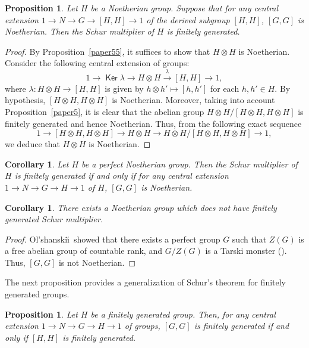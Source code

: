 \documentclass[12pt,reqno]{amsart}
\newtheorem{proposition}[subsection]{Proposition}
\newtheorem{corollary}[subsection]{Corollary}
\theoremstyle{definition}
\numberwithin{equation}{section}
\theoremstyle{definition}
\def\lam{\lambda}
\DeclareMathOperator{\Ker}{\mathsf {Ker}}
\begin{document}
\begin{proposition}
Let $H$ be a Noetherian group. Suppose that for any central extension $1\to N \to G \to [H, H] \to 1$ of the derived subgroup $[H, H]$, $[G, G]$ is Noetherian.
Then the Schur multiplier of $H$ is finitely generated.
\end{proposition}
\begin{proof}
By Proposition~\ref{paper55}, it suffices to show that $H\otimes H$ is Noetherian. Consider the following central extension of groups:
\[
1\to \Ker \lam \to H\otimes H \overset{\lam }{\longrightarrow} [H, H]\to 1 ,
\]
where $\lam \colon H\otimes H \to [H, H]$ is given by $h\otimes h'\mapsto [h, h']$ for each $h, h'\in H$. By hypothesis, $[H\otimes H, H\otimes H]$ is Noetherian. Moreover,
taking into account Proposition~\ref{paper5}, it is clear that the abelian group $H\otimes H / [H\otimes H, H\otimes H]$ is finitely generated and hence Noetherian. Thus, from the following exact sequence
\[
1\to  [H\otimes H, H\otimes H] \to H\otimes H \to H\otimes H / [H\otimes H, H\otimes H]\to 1 ,
\]
we deduce that $H\otimes H$ is Noetherian.
\end{proof}

\begin{corollary}
Let $H$ be a perfect Noetherian group. Then the Schur multiplier of $H$ is finitely generated if and only if for any central extension $1\to N \to G \to H \to 1$ of $H$, $[G, G]$ is Noetherian.
\end{corollary}

\begin{corollary}
There exists a Noetherian group which does not have finitely generated Schur multiplier.
\end{corollary}
\begin{proof}
Ol'shanski\u\i \ showed that there exists a perfect group $G$ such that $Z(G)$ is a free abelian group of countable
rank, and $G/Z(G)$ is a Tarski monster (\!\cite{Olsh}). Thus, $[G, G]$ is not Noetherian.
\end{proof}

The next proposition provides a generalization of  Schur's theorem for finitely generated groups.

\begin{proposition} \label{prop2}
Let $H$ be a finitely generated group. Then, for any central extension $1\to N \to G \to H \to 1$ of groups, $[G, G]$
is finitely generated if and only if $[H, H]$ is finitely generated.
\end{proposition}
\end{document}
